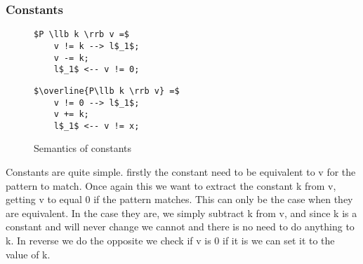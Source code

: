 \documentclass[a4paper]{article}
\begin{document}
\subsubsection{Constants}
\label{sec:org4edb57e}
\begin{figure}[!htb]
\begin{minipage}{0.4\textwidth}
\begin{lstlisting}
$P \llb k \rrb v =$
    v != k --> l$_1$;
    v -= k;
    l$_1$ <-- v != 0;
\end{lstlisting}
\end{minipage}
\qquad
\begin{minipage}{0.4\textwidth}
\begin{lstlisting}
$\overline{P\llb k \rrb v} =$
    v != 0 --> l$_1$;
    v += k;
    l$_1$ <-- v != x;
\end{lstlisting}
\end{minipage}

\caption{Semantics of constants}
\label{constants}
\end{figure}
Constants are quite simple. firstly the constant need to be equivalent to v for the pattern to match. Once again this we want to extract the constant k from v, getting v to equal 0 if the pattern matches. This can only be the case when they are equivalent. In the case they are, we simply subtract k from v, and since k is a constant and will never change we cannot and there is no need to do anything to k. In reverse we do the opposite we check if v is 0 if it is we can set it to the value of k.
\end{document}
